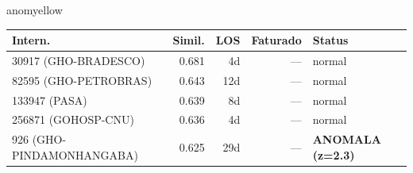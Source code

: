 \documentclass[a4paper,10pt]{article}
\begin{document}
\begin{anomalycard}[Internacao 184829 | PASA | MODERADO (z=2.21)]{anomyellow}
\begin{tabular}{l r r r l}\toprule\textbf{Intern.} & \textbf{Simil.} & \textbf{LOS} & \textbf{Faturado} & \textbf{Status} \\\midrule
30917 (GHO-BRADESCO) & 0.681 & 4d & --- & \textcolor{jcubeblue}{normal} \\
82595 (GHO-PETROBRAS) & 0.643 & 12d & --- & \textcolor{jcubeblue}{normal} \\
133947 (PASA) & 0.639 & 8d & --- & \textcolor{jcubeblue}{normal} \\
256871 (GOHOSP-CNU) & 0.636 & 4d & --- & \textcolor{jcubeblue}{normal} \\
926 (GHO-PINDAMONHANGABA) & 0.625 & 29d & --- & \textcolor{anomred}{\textbf{ANOMALA (z=2.3)}} \\
\bottomrule\end{tabular}


\end{anomalycard}

\newpage
\end{document}
